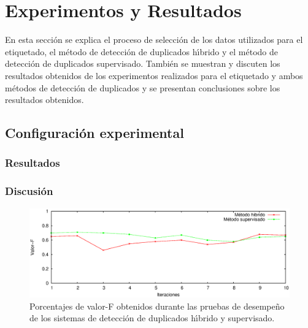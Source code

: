 \chapter{Experimentos y Resultados}
\label{resultados}


En esta secci\'{o}n  se explica el proceso de selecci\'{o}n de los datos utilizados para el etiquetado, el m\'{e}todo de  detecci\'{o}n de duplicados h\'{\i}brido y el m\'{e}todo de detecci\'{o}n de duplicados supervisado. Tambi\'{e}n se muestran y discuten los resultados obtenidos de los experimentos realizados para el etiquetado y ambos m\'{e}todos de detecci\'{o}n de duplicados y se presentan conclusiones sobre los resultados obtenidos.  

\section{Configuraci\'{o}n experimental}


\subsection{Resultados}

\subsection{Discusi\'{o}n}


\begin{figure}
  \begin{center}
    \includegraphics[width=0.55\linewidth]{fmeasurei3.eps}
  \end{center}
  \vspace*{-9mm}
  \caption{Porcentajes de valor-F obtenidos durante las pruebas de desempe\~{n}o de los sistemas de detecci\'{o}n de duplicados h\'{\i}brido y supervisado.}
  \label{duplicateDetectionFMeasure}
\end{figure}

\FloatBarrier


\clearpage
